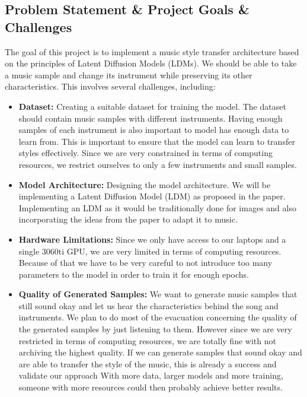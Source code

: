\subsection{Problem Statement \& Project Goals \& Challenges}
The goal of this project is to implement a music style transfer architecture based on the principles of Latent Diffusion Models (LDMs).
We should be able to take a music sample and change its instrument while preserving its other characteristics.
This involves several challenges, including:

\begin{itemize}
    \item \textbf{Dataset:} Creating a suitable dataset for training the model. 
      The dataset should contain music samples with different instruments. Having enough samples of each instrument is also important to 
      model has enough data to learn from. This is important to ensure that the model can learn to transfer styles effectively. 
      Since we are very constrained in terms of computing resources, we restrict ourselves to only a few instruments and small samples.

    \item \textbf{Model Architecture:} Designing the model architecture. 
      We will be implementing a Latent Diffusion Model (LDM) as proposed in the paper.
      Implementing an LDM as it would be traditionally done for images and also incorporating the ideas from the paper to adapt it to music.

    \item \textbf{Hardware Limitations:}
      Since we only have access to our laptops and a single 3060ti GPU, we are very limited in terms of computing resources.
      Because of that we have to be very careful to not introduce too many parameters to the model in order to train it for enough epochs.
      
    \item \textbf{Quality of Generated Samples:}
      We want to generate music samples that still sound okay and let us hear the characteristics behind the song and instruments.
      We plan to do most of the evacuation concerning the quality of the generated samples by just listening to them.
      However since we are very restricted in terms of computing resources, we are totally fine with not archiving the highest quality.
      If we can generate samples that sound okay and are able to transfer the style of the music, this is already a success and validate our approach
      With more data, larger models and more training, someone with more resources could then probably achieve better results.
\end{itemize}